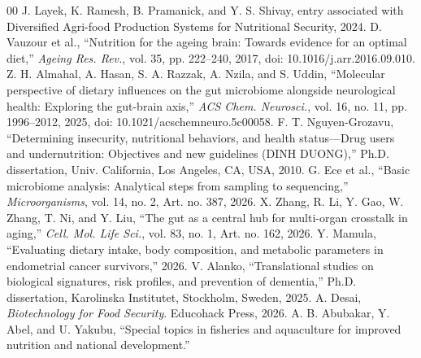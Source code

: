 \documentclass[conference]{IEEEtran}
\begin{document}
\begin{thebibliography}{00}
 J. Layek, K. Ramesh, B. Pramanick, and Y. S. Shivay, entry associated with Diversified Agri-food Production Systems for Nutritional Security, 2024.
 D. Vauzour et al., ``Nutrition for the ageing brain: Towards evidence for an optimal diet,'' \textit{Ageing Res. Rev.}, vol. 35, pp. 222--240, 2017, doi: 10.1016/j.arr.2016.09.010.
 Z. H. Almahal, A. Hasan, S. A. Razzak, A. Nzila, and S. Uddin, ``Molecular perspective of dietary influences on the gut microbiome alongside neurological health: Exploring the gut-brain axis,'' \textit{ACS Chem. Neurosci.}, vol. 16, no. 11, pp. 1996--2012, 2025, doi: 10.1021/acschemneuro.5c00058.
 F. T. Nguyen-Grozavu, ``Determining insecurity, nutritional behaviors, and health status---Drug users and undernutrition: Objectives and new guidelines (DINH DUONG),'' Ph.D. dissertation, Univ. California, Los Angeles, CA, USA, 2010.
 G. Ece et al., ``Basic microbiome analysis: Analytical steps from sampling to sequencing,'' \textit{Microorganisms}, vol. 14, no. 2, Art. no. 387, 2026.
 X. Zhang, R. Li, Y. Gao, W. Zhang, T. Ni, and Y. Liu, ``The gut as a central hub for multi-organ crosstalk in aging,'' \textit{Cell. Mol. Life Sci.}, vol. 83, no. 1, Art. no. 162, 2026.
 Y. Mamula, ``Evaluating dietary intake, body composition, and metabolic parameters in endometrial cancer survivors,'' 2026.
 V. Alanko, ``Translational studies on biological signatures, risk profiles, and prevention of dementia,'' Ph.D. dissertation, Karolinska Institutet, Stockholm, Sweden, 2025.
 A. Desai, \textit{Biotechnology for Food Security}. Educohack Press, 2026.
 A. B. Abubakar, Y. Abel, and U. Yakubu, ``Special topics in fisheries and aquaculture for improved nutrition and national development.''
\end{thebibliography}
\end{document}
